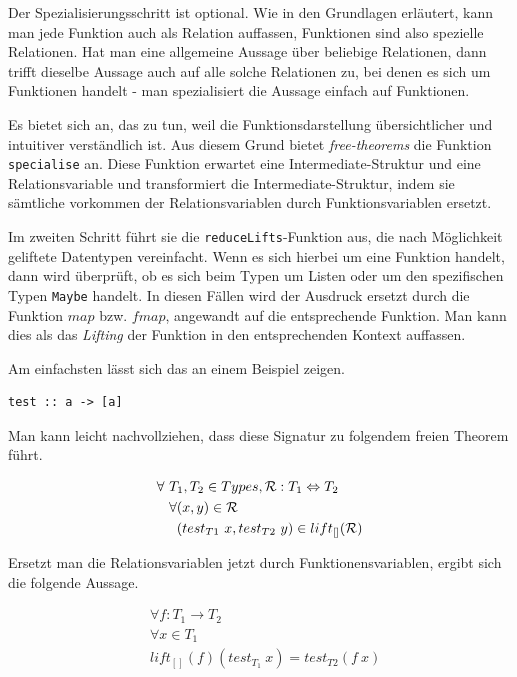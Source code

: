 Der Spezialisierungsschritt ist optional. Wie in den Grundlagen erläutert, kann man jede Funktion auch als Relation auffassen,
Funktionen sind also spezielle Relationen. Hat man eine allgemeine Aussage über beliebige Relationen, dann trifft dieselbe
Aussage auch auf alle solche Relationen zu, bei denen es sich um Funktionen handelt - man spezialisiert die Aussage einfach
auf Funktionen.

Es bietet sich an, das zu tun, weil die Funktionsdarstellung übersichtlicher und intuitiver verständlich ist. Aus diesem Grund
bietet \textit{free-theorems} die Funktion \texttt{specialise} an. Diese Funktion erwartet eine Intermediate-Struktur und
eine Relationsvariable und transformiert die Intermediate-Struktur, indem sie sämtliche vorkommen der Relationsvariablen
durch Funktionsvariablen ersetzt.

Im zweiten Schritt führt sie die \texttt{reduceLifts}-Funktion aus, die nach Möglichkeit geliftete Datentypen vereinfacht.
Wenn es sich hierbei um eine Funktion handelt, dann wird überprüft, ob es sich beim Typen
um Listen oder um den spezifischen Typen \texttt{Maybe} handelt. In diesen Fällen wird der Ausdruck ersetzt durch die
Funktion $map$ bzw. $fmap$, angewandt auf die entsprechende Funktion. Man kann dies als das \textit{Lifting} der Funktion
in den entsprechenden Kontext auffassen.

Am einfachsten lässt sich das an einem Beispiel zeigen.

\begin{verbatim}
test :: a -> [a]
\end{verbatim}

Man kann leicht nachvollziehen, dass diese Signatur zu folgendem freien Theorem führt.

\begin{align*}
& \forall~ T_1, T_2 \in Types, \mathcal{R} : T_1 \Leftrightarrow T_2 \\
& \hphantom{\forall~} \forall (x, y) \in \mathcal{R} \\
& \hphantom{\forall~ \forall} (test_{T1}\ x, test_{T2}\ y) \in lift_{[]}(\mathcal{R})
\end{align*}

Ersetzt man die Relationsvariablen jetzt durch Funktionensvariablen, ergibt sich die folgende Aussage.

\begin{align*}
& \forall f : T_1 \rightarrow T_2 \\
& \forall x \in T_1 \\
& lift_{[]}(f) (test_{T_1}\ x) = test_{T2} (f\ x)
\end{align*}


